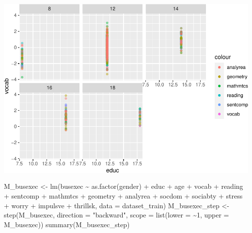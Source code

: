 \documentclass[
]{article}
\newenvironment{Shaded}{\begin{snugshade}}{\end{snugshade}}
\newcommand{\AttributeTok}[1]{\textcolor[rgb]{0.77,0.63,0.00}{#1}}
\newcommand{\DecValTok}[1]{\textcolor[rgb]{0.00,0.00,0.81}{#1}}
\newcommand{\FunctionTok}[1]{\textcolor[rgb]{0.00,0.00,0.00}{#1}}
\newcommand{\NormalTok}[1]{#1}
\newcommand{\OtherTok}[1]{\textcolor[rgb]{0.56,0.35,0.01}{#1}}
\newcommand{\SpecialCharTok}[1]{\textcolor[rgb]{0.00,0.00,0.00}{#1}}
\newcommand{\StringTok}[1]{\textcolor[rgb]{0.31,0.60,0.02}{#1}}
\begin{document}
\includegraphics{HW5-Trinath-Sai-Subhash-Reddy-Pittala_files/figure-latex/unnamed-chunk-6-1.pdf}

\begin{Shaded}
\begin{Highlighting}[]
\NormalTok{M\_busexec }\OtherTok{\textless{}{-}} \FunctionTok{lm}\NormalTok{(busexec }\SpecialCharTok{\textasciitilde{}} \FunctionTok{as.factor}\NormalTok{(gender) }\SpecialCharTok{+}\NormalTok{ educ }\SpecialCharTok{+}\NormalTok{ age }\SpecialCharTok{+}\NormalTok{ vocab }\SpecialCharTok{+}
\NormalTok{    reading }\SpecialCharTok{+}\NormalTok{ sentcomp }\SpecialCharTok{+}\NormalTok{ mathmtcs }\SpecialCharTok{+}\NormalTok{ geometry }\SpecialCharTok{+}\NormalTok{ analyrea }\SpecialCharTok{+}\NormalTok{ socdom }\SpecialCharTok{+}
\NormalTok{    sociabty }\SpecialCharTok{+}\NormalTok{ stress }\SpecialCharTok{+}\NormalTok{ worry }\SpecialCharTok{+}\NormalTok{ impulsve }\SpecialCharTok{+}\NormalTok{ thrillsk, }\AttributeTok{data =}\NormalTok{ dataset\_train)}
\NormalTok{M\_busexec\_step }\OtherTok{\textless{}{-}} \FunctionTok{step}\NormalTok{(M\_busexec, }\AttributeTok{direction =} \StringTok{"backward"}\NormalTok{, }\AttributeTok{scope =} \FunctionTok{list}\NormalTok{(}\AttributeTok{lower =} \SpecialCharTok{\textasciitilde{}}\DecValTok{1}\NormalTok{,}
    \AttributeTok{upper =}\NormalTok{ M\_busexec))}
\FunctionTok{summary}\NormalTok{(M\_busexec\_step)}
\end{Highlighting}
\end{Shaded}
\end{document}
